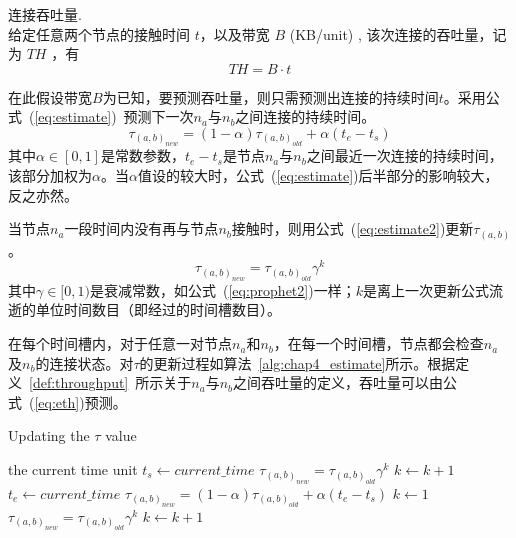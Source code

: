\begin{definition}连接吞吐量. \\
给定任意两个节点的接触时间 $t$，以及带宽 $B$ (KB/unit) , 该次连接的吞吐量，记为 $TH$ ，有
\[
TH=B\cdot t
\]
\label{def:throughput}
\end{definition}

在此假设带宽$B$为已知，要预测吞吐量，则只需预测出连接的持续时间$t$。采用公式~(\ref{eq:estimate})~预测下一次$n_a$与$n_b$之间连接的持续时间。
\begin{equation}
\tau_{(a,b)_{new}}=(1-\alpha)\tau_{(a,b)_{old}}+\alpha(t_e-t_s)
\label{eq:estimate}
\end{equation}
其中$\alpha\in[0,1]$是常数参数，$t_e-t_s$是节点$n_a$与$n_b$之间最近一次连接的持续时间，该部分加权为$\alpha$。当$\alpha$值设的较大时，公式~(\ref{eq:estimate})后半部分的影响较大，反之亦然。

当节点$n_a$一段时间内没有再与节点$n_b$接触时，则用公式~(\ref{eq:estimate2})更新$\tau_{(a,b)}$。
\begin{equation}
\tau_{(a,b)_{new}}=\tau_{(a,b)_{old}}\gamma^{k}
\label{eq:estimate2}
\end{equation}
其中$\gamma\in[0,1)$是衰减常数，如公式~(\ref{eq:prophet2})一样；$k$是离上一次更新公式流逝的单位时间数目（即经过的时间槽数目）。

在每个时间槽内，对于任意一对节点$n_a$和$n_b$，在每一个时间槽，节点都会检查$n_a$及$n_b$的连接状态。对$\tau$的更新过程如算法~\ref{alg:chap4_estimate}所示。根据定义~\ref{def:throughput}~所示关于$n_a$与$n_b$之间吞吐量的定义，吞吐量可以由公式~(\ref{eq:eth})预测。

\begin{algorithm}[tbp] %
\renewcommand{\algorithmicrequire}{\textbf{For}}
\caption{Updating the $\tau$ value} %
\label{alg:chap4_estimate} %
\begin{algorithmic}[1] %
\REQUIRE the current time unit
    \STATE $t_s\leftarrow current\_time$
    \STATE $\tau_{(a,b)_{new}}=\tau_{(a,b)_{old}}\gamma^{k}$
    \STATE $k\leftarrow k+1$
    \STATE $t_e\leftarrow current\_time$
    \STATE $\tau_{(a,b)_{new}}=(1-\alpha)\tau_{(a,b)_{old}}+\alpha(t_e-t_s)$
    \STATE $k\leftarrow 1$
\ELSE
    \STATE $\tau_{(a,b)_{new}}=\tau_{(a,b)_{old}}\gamma^{k}$
    \STATE $k\leftarrow k+1$
\ENDIF    
\end{algorithmic}
\end{algorithm}


